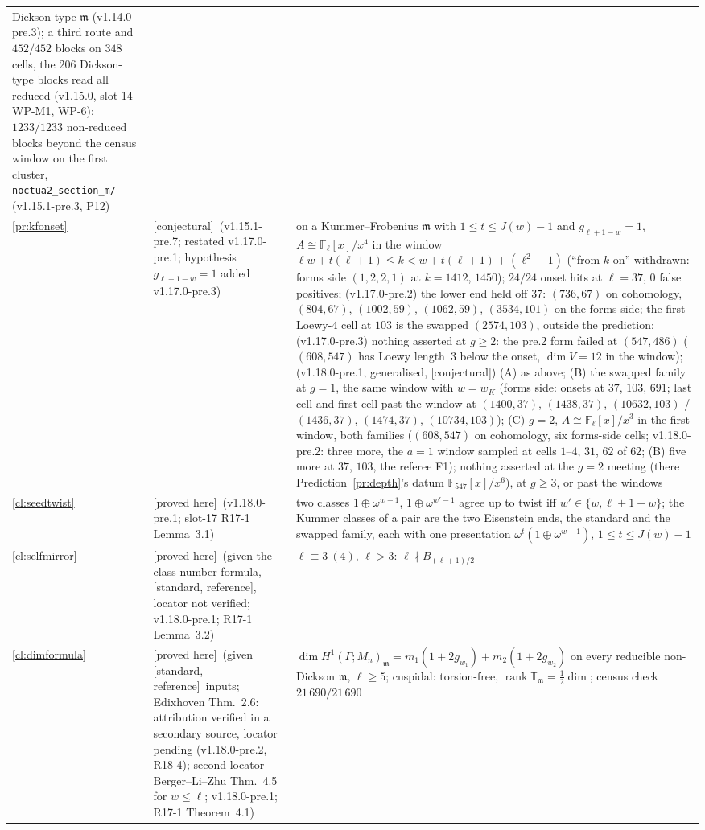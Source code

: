 \documentclass[11pt]{article}
\theoremstyle{remark}
\newcommand{\F}{\mathbb{F}}
\newcommand{\Ga}{\Gamma}
\newcommand{\Fl}{\F_\ell}
\DeclareMathOperator{\rank}{rank}
\newcommand{\T}{\mathbb{T}}
\newcommand{\m}{\mathfrak{m}}
\newcommand{\Mn}{M_n}
\newcommand{\PROVED}{\textsf{[proved here]}}
\newcommand{\STD}{\textsf{[standard, reference]}}
\newcommand{\CONJ}{\textsf{[conjectural]}}
\begin{document}
\begin{center}
\begin{longtable}{@{}l>{\raggedright\arraybackslash}p{3.6cm}>{\raggedright\arraybackslash}p{10.6cm}@{}}
Dickson-type $\m$ (v1.14.0-pre.3); a third route and $452/452$ blocks on $348$ cells, the $206$ Dickson-type blocks read all reduced (v1.15.0, slot-14 WP-M1, WP-6); $1233/1233$ non-reduced blocks beyond the census window on the first cluster, \texttt{noctua2\_section\_m/} (v1.15.1-pre.3, P12) \\
\ref{pr:kfonset} & \CONJ\ (v1.15.1-pre.7; restated v1.17.0-pre.1; hypothesis $g_{\ell+1-w}=1$ added v1.17.0-pre.3) & on a Kummer--Frobenius $\m$ with $1\le t\le J(w)-1$ and $g_{\ell+1-w}=1$, $A\cong\Fl[x]/x^4$ in the window $\ell w+t(\ell+1)\le k<w+t(\ell+1)+(\ell^2-1)$ (``from $k$ on'' withdrawn: forms side $(1,2,2,1)$ at $k=1412$, $1450$); $24/24$ onset hits at $\ell=37$, $0$ false positives; (v1.17.0-pre.2) the lower end held off $37$: $(736,67)$ on cohomology, $(804,67)$, $(1002,59)$, $(1062,59)$, $(3534,101)$ on the forms side; the first Loewy-$4$ cell at $103$ is the swapped $(2574,103)$, outside the prediction; (v1.17.0-pre.3) nothing asserted at $g\ge2$: the pre.2 form failed at $(547,486)$ ($(608,547)$ has Loewy length~$3$ below the onset, $\dim V=12$ in the window);
(v1.18.0-pre.1, generalised, \CONJ) (A) as above; (B) the swapped family at $g=1$, the same window with $w=w_K$ (forms side: onsets at $37$, $103$, $691$; last cell
and first cell past the window at $(1400,37)$, $(1438,37)$, $(10632,103)$ / $(1436,37)$, $(1474,37)$, $(10734,103)$); (C) $g=2$, $A\cong\Fl[x]/x^3$ in the first
window, both families ($(608,547)$ on cohomology, six forms-side cells; v1.18.0-pre.2: three more, the $a=1$ window sampled at cells $1$--$4$, $31$, $62$ of $62$;
(B) five more at $37$, $103$, the referee F1); nothing asserted at the $g=2$ meeting (there Prediction~\ref{pr:depth}'s datum $\F_{547}[x]/x^6$), at $g\ge3$, or past the windows \\
\ref{cl:seedtwist} & \PROVED\ (v1.18.0-pre.1; slot-17 R17-1 Lemma~3.1) & two classes $1\oplus\omega^{w-1}$, $1\oplus\omega^{w'-1}$ agree up to twist iff $w'\in\{w,\ell+1-w\}$; the Kummer classes of a pair are the two Eisenstein ends, the standard and the swapped family, each with one presentation $\omega^t(1\oplus\omega^{w-1})$, $1\le t\le J(w)-1$ \\
\ref{cl:selfmirror} & \PROVED\ (given the class number formula, \STD, locator not verified; v1.18.0-pre.1; R17-1 Lemma~3.2) & $\ell\equiv3\ (4)$, $\ell>3$: $\ell\nmid B_{(\ell+1)/2}$ \\
\ref{cl:dimformula} & \PROVED\ (given \STD\ inputs; Edixhoven Thm.~2.6: attribution verified in a secondary source, locator pending (v1.18.0-pre.2, R18-4); second locator Berger--Li--Zhu Thm.~4.5 for $w\le\ell$; v1.18.0-pre.1; R17-1 Theorem~4.1) & $\dim H^1(\Ga;\Mn)_\m=m_1(1+2g_{w_1})+m_2(1+2g_{w_2})$ on every reducible non-Dickson $\m$, $\ell\ge5$; cuspidal: torsion-free, $\rank\T_\m=\frac12\dim$; census check $21\,690/21\,690$ \\

\end{longtable}
\end{center}
\end{document}
